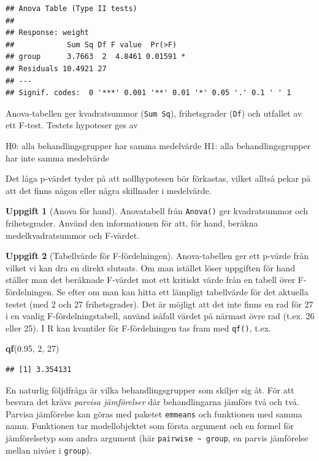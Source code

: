 \documentclass[
]{book}
\newenvironment{Shaded}{\begin{snugshade}}{\end{snugshade}}
\newcommand{\DecValTok}[1]{\textcolor[rgb]{0.00,0.00,0.81}{#1}}
\newcommand{\FloatTok}[1]{\textcolor[rgb]{0.00,0.00,0.81}{#1}}
\newcommand{\FunctionTok}[1]{\textcolor[rgb]{0.13,0.29,0.53}{\textbf{#1}}}
\newcommand{\NormalTok}[1]{#1}
\theoremstyle{definition}
\theoremstyle{definition}
\theoremstyle{definition}
\newtheorem{exercise}{Uppgift}[chapter]
\theoremstyle{definition}
\theoremstyle{remark}
\begin{document}
\begin{verbatim}
## Anova Table (Type II tests)
## 
## Response: weight
##            Sum Sq Df F value  Pr(>F)  
## group      3.7663  2  4.8461 0.01591 *
## Residuals 10.4921 27                  
## ---
## Signif. codes:  0 '***' 0.001 '**' 0.01 '*' 0.05 '.' 0.1 ' ' 1
\end{verbatim}

Anova-tabellen ger kvadratsummor (\texttt{Sum\ Sq}), frihetsgrader (\texttt{Df}) och utfallet av ett F-test. Testets hypoteser ges av

H0: alla behandlingsgrupper har samma medelvärde
H1: alla behandlingsgrupper har inte samma medelvärde

Det låga p-värdet tyder på att nollhypotesen bör förkastas, vilket alltså pekar på att det finns någon eller några skillnader i medelvärde.

\begin{exercise}[Anova för hand]
Anovatabell från \texttt{Anova()} ger kvadratsummor och frihetsgrader. Använd den informationen för att, för hand, beräkna medelkvadratsummor och F-värdet.
\end{exercise}

\begin{exercise}[Tabellvärde för F-fördelningen]

Anova-tabellen ger ett p-värde från vilket vi kan dra en direkt slutsats. Om man istället löser uppgiften för hand ställer man det beräknade F-värdet mot ett kritiskt värde från en tabell över F-fördelningen. Se efter om man kan hitta ett lämpligt tabellvärde för det aktuella testet (med 2 och 27 frihetsgrader). Det är möjligt att det inte finns en rad för 27 i en vanlig F-fördelningstabell, använd isåfall värdet på närmast övre rad (t.ex. 26 eller 25). I R kan kvantiler för F-fördelningen tas fram med \texttt{qf()}, t.ex.

\begin{Shaded}
\begin{Highlighting}[]
\FunctionTok{qf}\NormalTok{(}\FloatTok{0.95}\NormalTok{, }\DecValTok{2}\NormalTok{, }\DecValTok{27}\NormalTok{)}
\end{Highlighting}
\end{Shaded}

\begin{verbatim}
## [1] 3.354131
\end{verbatim}

\end{exercise}

En naturlig följdfråga är vilka behandlingsgrupper som skiljer sig åt. För att besvara det krävs \emph{parvisa jämförelser} där behandlingarna jämförs två och två. Parvisa jämförelse kan göras med paketet \texttt{emmeans} och funktionen med samma namn. Funktionen tar modellobjektet som första argument och en formel för jämförelsetyp som andra argument (här \texttt{pairwise\ \textasciitilde{}\ group}, en parvis jämförelse mellan nivåer i \texttt{group}).
\end{document}
